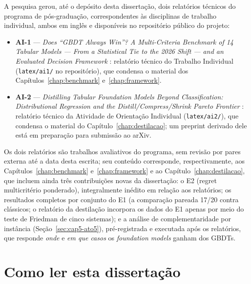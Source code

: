A pesquisa gerou, até o depósito desta dissertação, dois relatórios
técnicos do programa de pós-graduação, correspondentes às disciplinas de
trabalho individual, ambos em inglês e disponíveis no repositório público
do projeto:

\begin{itemize}
  \item \textbf{AI-1} --- \emph{Does ``GBDT Always Win''? A Multi-Criteria
    Benchmark of 14 Tabular Models --- From a Statistical Tie to the 2026
    Shift --- and an Evaluated Decision Framework} \citep{companion2026}:
    relatório técnico do Trabalho Individual (\texttt{latex/ai1/} no
    repositório), que condensa o material dos
    Capítulos~\ref{chap:benchmark} e~\ref{chap:framework}.
  \item \textbf{AI-2} --- \emph{Distilling Tabular Foundation Models
    Beyond Classification: Distributional Regression and the
    Distill/Compress/Shrink Pareto Frontier} \citep{companion-ai2-2026}: relatório técnico da Atividade de
    Orientação Individual (\texttt{latex/ai2/}), que condensa o material
    do Capítulo~\ref{chap:destilacao}; um preprint derivado dele está em
    preparação para submissão ao arXiv.
\end{itemize}

Os dois relatórios são trabalhos avaliativos do programa, sem revisão por
pares externa até a data desta escrita; seu conteúdo corresponde,
respectivamente, aos Capítulos~\ref{chap:benchmark}
e~\ref{chap:framework} e ao Capítulo~\ref{chap:destilacao}, que incluem
ainda três contribuições novas da dissertação: o E2 (regret
multicritério ponderado), integralmente inédito em relação aos
relatórios; os resultados completos por conjunto do E1 (a comparação
pareada 17/20 contra clássicos; o relatório da destilação
incorpora os dados do E1 apenas por meio do teste de Friedman de cinco
sistemas); e a análise de complementaridade por instância
(Seção~\ref{sec:cap5-ato5}), pré-registrada e executada após os
relatórios, que responde \emph{onde} e \emph{em que casos} os
\emph{foundation models} ganham dos GBDTs.

\section{Como ler esta dissertação}
\label{sec:intro-comoler}

